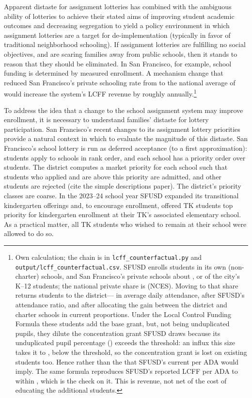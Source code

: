 \documentclass{article}
\begin{document}
Apparent distaste for assignment lotteries has combined with the ambiguous ability of lotteries to achieve their stated aims of improving student academic outcomes and decreasing segregation to yield a policy environment in which assignment lotteries are a target for de-implementation (typically in favor of traditional neighborhood schooling). If assignment lotteries are fulfilling no social objectives, and are scaring families away from public schools, then it stands to reason that they should be eliminated. In San Francisco, for example, school funding is determined by measured enrollment. A mechanism change that reduced San Francisco's private schooling rate from \numPrivateShare{} to the national average of \numNationalPrivateShare{} would increase the system's LCFF revenue by roughly \numLcffGain{} annually.\footnote{Own calculation; the chain is in \texttt{lcff\_counterfactual.py} and \texttt{output/lcff\_counterfactual.csv}. SFUSD enrolls \numSfusdEnrollment{} students in its own (non-charter) schools, and San Francisco's private schools about \numPrivateStudents, or \numPrivateShare{} of the city's K--12 students; the national private share is \numNationalPrivateShare{} (NCES). Moving to that share returns \numStudentsGained{} students to the district---\numAdaGained{} in average daily attendance, after SFUSD's attendance ratio, and after allocating the gain between the district and charter schools in current proportions. Under the Local Control Funding Formula these students add the base grant, but, not being unduplicated pupils, they dilute the concentration grant SFUSD draws because its unduplicated pupil percentage (\numUPP) exceeds the \numUPPthreshold{} threshold: an influx this size takes it to \numUPPafter, below the threshold, so the concentration grant is lost on existing students too. Hence \numLcffGain{} rather than the \numLcffNaiveGain{} that SFUSD's current \numLcffPerAda{} per ADA would imply. The same formula reproduces SFUSD's reported LCFF per ADA to within \numLcffModelError, which is the check on it. This is revenue, not net of the cost of educating the additional students.}

To address the idea that a change to the school assignment system may improve enrollment, it is necessary to understand families' distaste for lottery participation. San Francisco's recent changes to its assignment lottery priorities provide a natural context in which to evaluate the magnitude of this distaste. San Francisco's school lottery is run as deferred acceptance (to a first approximation): students apply to schools in rank order, and each school has a priority order over students. The district computes a market priority for each school such that students who applied and are above this priority are admitted, and other students are rejected (cite the simple descriptions paper). The district's priority classes are coarse. In the 2023--24 school year SFUSD expanded its transitional kindergarten offerings and, to encourage enrollment, offered TK students top priority for kindergarten enrollment at their TK's associated elementary school. As a practical matter, all TK students who wished to remain at their school were allowed to do so.
\end{document}
